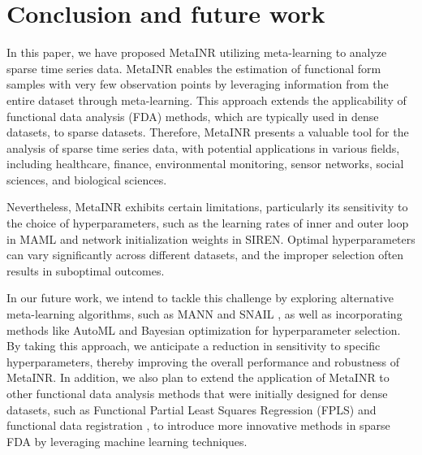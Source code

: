 \documentclass{article}
\begin{document}
\section{Conclusion and future work}
In this paper, we have proposed MetaINR utilizing meta-learning to analyze sparse time series data. 
MetaINR enables the estimation of functional form samples with very few observation points by leveraging information from the entire dataset through meta-learning. 
This approach extends the applicability of functional data analysis (FDA) methods, which are typically used in dense datasets, to sparse datasets. 
Therefore, MetaINR presents a valuable tool for the analysis of sparse time series data, with potential applications in various fields, 
including healthcare, finance, environmental monitoring, sensor networks, social sciences, and biological sciences.  


Nevertheless, MetaINR exhibits certain limitations, particularly its sensitivity to the choice of hyperparameters, 
such as the learning rates of inner and outer loop in MAML and network initialization weights in SIREN. 
Optimal hyperparameters can vary significantly across different datasets, 
and the improper selection often results in suboptimal outcomes.

In our future work, 
we intend to tackle this challenge by exploring alternative meta-learning algorithms, 
such as MANN \cite{santoro2016meta} and SNAIL \cite{mishra2017simple}, 
as well as incorporating methods like AutoML \cite{he2021automl} and Bayesian optimization \cite{wu2019hyperparameter} for hyperparameter selection.
By taking this approach, we anticipate a reduction in sensitivity to specific hyperparameters, thereby improving the overall performance and robustness of MetaINR.
In addition, we also plan to extend the application of MetaINR to other functional data analysis methods that were initially designed for dense datasets, such as Functional Partial Least Squares Regression (FPLS) \cite{reiss2007functional} and functional data registration \cite{srivastava2011registration},
to introduce more innovative methods in sparse FDA by leveraging machine learning techniques.
\end{document}
